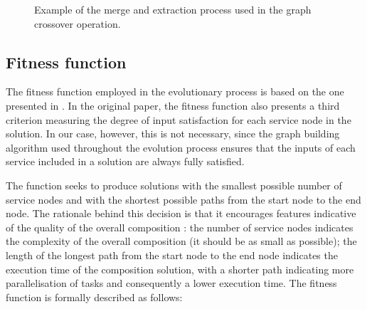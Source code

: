 \documentclass{article}
\begin{document}
\begin{figure}[h]
\centerline{
}
\caption{Example of the merge and extraction process used in the graph crossover operation.}
\label{fig:crossoverExample}
\end{figure}



\subsection{Fitness function}
The fitness function employed in the evolutionary process is based on the one presented in \cite{rodriguez2010composition}. 
In the original paper, the fitness function also presents a third criterion measuring the degree of input satisfaction
for each service node in the solution. In our case, however, this is not necessary, since the graph building algorithm used throughout
the evolution process ensures that the inputs of each service included in a solution are always fully satisfied.

The function seeks to produce solutions with the smallest possible number of service nodes and with the shortest possible paths from the start node to the
end node. The rationale behind this decision is that it encourages features indicative of the quality of the overall composition \cite{rodriguez2010composition}:
the number of service nodes indicates the complexity of the overall composition (it should be as small as possible); the length of
the longest path from the start node to the end node indicates the execution time of the composition solution, with a shorter
path indicating more parallelisation of tasks and consequently a lower execution time. The fitness function is formally described as follows:
\end{document}
